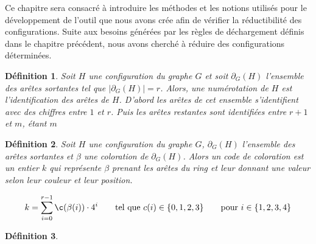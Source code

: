 \documentclass[10pt,a4paper]{article}
\newtheorem{definition}{Définition}
\begin{document}
Ce chapitre sera consacré à introduire les méthodes et les notions utilisés pour le développement de l'outil que nous avons crée afin de vérifier la réductibilité des configurations. Suite aux besoins générées par les règles de déchargement définis dans le chapitre précédent, nous avons cherché à réduire des configurations déterminées.



\begin{definition}
Soit $H$ une configuration du graphe $G$ et soit $\partial_G(H)$ l'ensemble des arêtes sortantes tel que $|\partial_G(H)|=r$. Alors, une \emph{numérotation} de $H$ est l'identification des arêtes de $H$. D'abord les arêtes de cet ensemble s'identifient avec des chiffres  entre $1$ et $r$. Puis les arêtes restantes sont identifiées entre $r+1$ et $m$, étant $m$
\end{definition}

\begin{definition}
Soit $H$ une configuration du graphe $G$, $\partial_G(H)$ l'ensemble des arêtes sortantes et $\beta$ une coloration de $\partial_G(H)$. Alors un \emph{code de coloration} est un entier $k$ qui représente $\beta$ prenant les arêtes du ring et leur donnant une valeur selon leur couleur et leur position.

$$
k = \sum_{i=0}^{r-1} \c(\beta(i)) \cdot 4^{i} \qquad \textrm{tel que   } c(i) \in \{ 0,1,2,3 \} \qquad \textrm{pour  } i \in \{1,2,3,4 \}
$$
\label{de:code}
\end{definition}

\begin{definition}

\end{definition}
\end{document}
